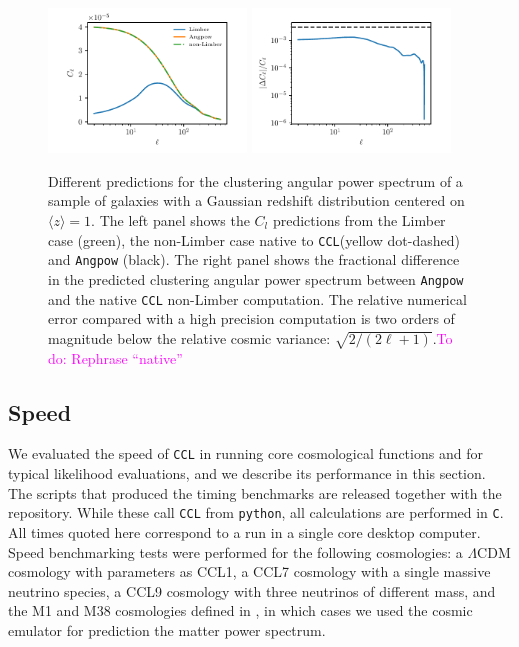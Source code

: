 \documentclass[\docopts]{\docclass}
\newcommand{\todo}[1]{\textcolor{magenta}{To do: #1}}
\newcommand{\ccl}{{\tt CCL}\xspace}
\begin{document}
\begin{figure}[htbp]
\centering
\includegraphics[width=0.47\textwidth]{angpow1}
\includegraphics[width=0.47\textwidth]{angpow3}
\caption{Different predictions for the clustering angular power spectrum of a sample of galaxies with a Gaussian redshift distribution centered on $\langle z \rangle =1$. The left panel shows the $C_l$ predictions from the Limber case (green), the non-Limber case native to \ccl (yellow dot-dashed) and {\tt Angpow} (black). The right panel shows the fractional difference in the predicted clustering angular power spectrum between {\tt Angpow} and the native \ccl non-Limber computation. The relative numerical error compared with a high precision computation is two orders of magnitude below the relative cosmic variance: $\sqrt{2/(2\ell+1)}$.\todo{Rephrase ``native''}}
\label{fig:angpow}
\end{figure}

\subsection{Speed}
\label{ss:speed}

We evaluated the speed of \ccl in running core cosmological functions and for typical likelihood evaluations, and we describe its performance in this section. The scripts that produced the timing benchmarks are released together with the repository. While these call \ccl from {\tt python}, all calculations are performed in {\tt C}. All times quoted here correspond to a run in a single core desktop computer. Speed benchmarking tests were performed for the following cosmologies: a $\Lambda$CDM cosmology with parameters as CCL1, a CCL7 cosmology with a single massive neutrino species, a CCL9 cosmology with three neutrinos of different mass, and the M1 and M38 cosmologies defined in \citet{Lawrence17}, in which cases we used the cosmic emulator for prediction the matter power spectrum. 
\end{document}
